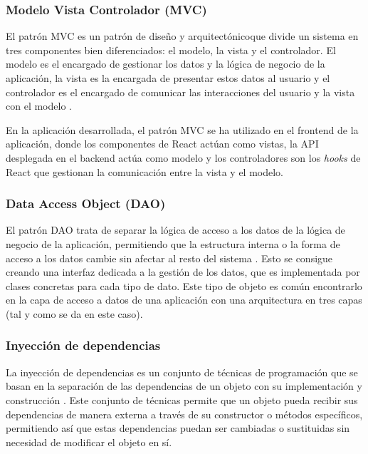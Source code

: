 \subsubsection{Modelo Vista Controlador (MVC)}
El patrón MVC es un patrón de diseño y arquitectónico\footnotemark que divide un
sistema en tres componentes bien diferenciados: el modelo, la vista y el
controlador. El modelo es el encargado de gestionar los datos y la lógica de negocio
de la aplicación, la vista es la encargada de presentar estos datos al usuario y el
controlador es el encargado de comunicar las interacciones del usuario y la vista
con el modelo \parencite{NorfolkDevelopers2015Dec}.


En la aplicación desarrollada, el patrón MVC se ha utilizado en el \gls{frontend} de la
aplicación, donde los componentes de React actúan como vistas, la API desplegada en el
backend actúa como modelo y los controladores son los \textit{hooks} de React que
gestionan la comunicación entre la vista y el modelo.

\subsubsection{Data Access Object (DAO)}
El patrón DAO trata de separar la lógica de acceso a los datos de la lógica de
negocio de la aplicación, permitiendo que la estructura interna o la forma de
acceso a los datos cambie sin afectar al resto del sistema
\parencites{DAOJ2EE}{Zato2020Dao}. Esto se consigue creando una interfaz
dedicada a la gestión de los datos, que es implementada por clases concretas
para cada tipo de dato. Este tipo de objeto es común encontrarlo en la capa de
acceso a datos de una aplicación con una arquitectura en tres capas (tal y como
se da en este caso).

\subsubsection{Inyección de dependencias}
La inyección de dependencias es un conjunto de técnicas de programación que se
basan en la separación de las dependencias de un objeto con su implementación y
construcción \parencite{Seemann2025Jun}. Este conjunto de técnicas permite que
un objeto pueda recibir sus dependencias de manera externa a través de su
constructor o métodos específicos, permitiendo así que estas dependencias puedan
ser cambiadas o sustituidas sin necesidad de modificar el objeto en sí.


